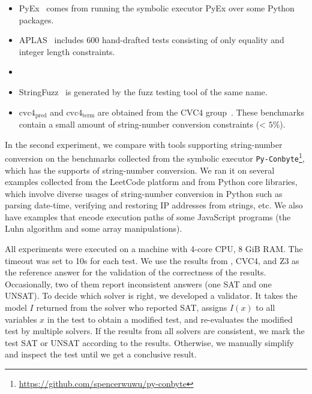 \begin{itemize}
	\item PyEx~\cite{pyex} comes from running the symbolic executor PyEx over some Python packages.
	
	\smallskip
	
	
	\item APLAS~\cite{aplas} includes 600 hand-drafted tests consisting of only equality and integer length constraints.
	
	
		\smallskip


	\item {}
	
		\smallskip

	\item StringFuzz~\cite{blotsky2018stringfuzz}  is generated by the fuzz testing tool of the same name.
	
		\smallskip

	\item $\text{cvc4}_{\text{pred}}$ and $\text{cvc4}_{\text{term}}$ are obtained from the CVC4 group~\cite{termEQ}. These benchmarks contain a small amount of string-number conversion constraints (< $5\%$).
\end{itemize}

In the second experiment, we compare with tools supporting string-number conversion on the benchmarks collected from the symbolic executor \texttt{Py-Conbyte}\footnote{\url{https://github.com/spencerwuwu/py-conbyte}}, which has the supports of string-number conversion. We ran it on several examples collected from the LeetCode platform and from Python core libraries, which involve diverse usages of string-number conversion in Python such as parsing date-time, verifying and restoring IP addresses from strings, etc. We also have examples that encode execution paths of some JavaScript programs (the Luhn algorithm and some array manipulations).

All experiments were executed on a machine with 4-core CPU, 8 GiB RAM. The timeout was set to 10s for each test.
We use the results from {\tool}, CVC4, and Z3 as the reference answer for the validation of the correctness of the results. Occasionally, two of them report inconsistent  answers (one SAT and one UNSAT). To decide which solver is right, we developed a validator. It takes the model $I$ returned from the solver who reported SAT, assigns $I(x)$ to all variables $x$ in the test to obtain a modified test, and re-evaluates the modified test by multiple solvers. If the results from all solvers are consistent, we mark the test SAT or UNSAT according to the results. Otherwise, we manually simplify and inspect the test until we get a conclusive result. 

